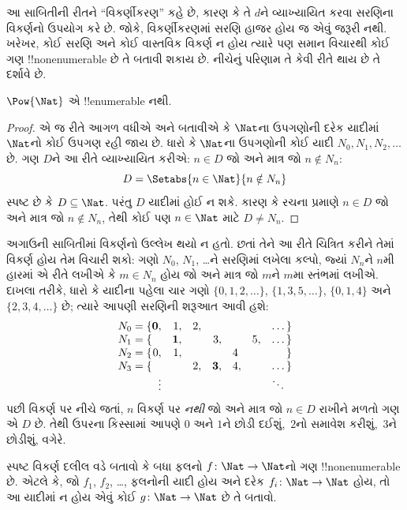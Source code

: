 \documentclass[../../../include/open-logic-section]{subfiles}
\begin{document}
\begin{explain}
આ સાબિતીની રીતને “વિકર્ણીકરણ” કહે છે, કારણ કે તે $d$ને વ્યાખ્યાયિત
કરવા સરણિના વિકર્ણનો ઉપયોગ કરે છે. જોકે, વિકર્ણીકરણમાં સરણિ હાજર
હોય જ એવું જરૂરી નથી. ખરેખર, કોઈ સરણિ અને કોઈ વાસ્તવિક વિકર્ણ ન
હોય ત્યારે પણ સમાન વિચારથી કોઈ ગણ !!{nonenumerable} છે તે બતાવી
શકાય છે. નીચેનું પરિણામ તે કેવી રીતે થાય છે તે દર્શાવે છે.
\end{explain}

\begin{thm}
$\Pow{\Nat}$ એ !!{enumerable} નથી.
\end{thm}

\begin{proof}
એ જ રીતે આગળ વધીએ અને બતાવીએ કે $\Nat$ના ઉપગણોની દરેક યાદીમાં
$\Nat$નો કોઈ ઉપગણ રહી જાય છે. ધારો કે $\Nat$ના ઉપગણોની કોઈ યાદી
$N_0, N_1, N_2, \ldots$ છે. ગણ $D$ને આ રીતે વ્યાખ્યાયિત કરીએ:
$n \in D$ જો અને માત્ર જો $n \notin N_{n}$:
\[
D = \Setabs{n \in \Nat}{n \notin N_n}
\]
સ્પષ્ટ છે કે $D\subseteq \Nat$. પરંતુ $D$ યાદીમાં હોઈ ન શકે.
કારણ કે રચના પ્રમાણે $n \in D$ જો અને માત્ર જો $n\notin N_n$,
તેથી કોઈ પણ $n \in \Nat$ માટે $D \neq N_n$.
\end{proof}

\begin{explain}
અગાઉની સાબિતીમાં વિકર્ણનો ઉલ્લેખ થયો ન હતો. છતાં તેને આ રીતે
ચિત્રિત કરીને તેમાં વિકર્ણ હોય તેમ વિચારી શકો: ગણો $N_0$, $N_1$,
\dots{}ને સરણિમાં લખેલા કલ્પો, જ્યાં $N_n$ને $n$મી હારમાં એ રીતે
લખીએ કે $m \in N_n$ હોય જો અને માત્ર જો $m$ને $m$મા સ્તંભમાં
લખીએ. દાખલા તરીકે, ધારો કે યાદીના પહેલા ચાર ગણો
$\{0,1,2,\dots\}$, $\{1, 3, 5, \dots\}$, $\{0,1,4\}$ અને
$\{2,3,4,\dots\}$ છે; ત્યારે આપણી સરણિની શરૂઆત આવી હશે:
\[
\begin{array}{r@{}rrrrrrr}
  N_0 = \{ & \mathbf{0}, & 1, & 2, & & & & \dots\}\\
  N_1 = \{ &  & \mathbf{1}, &  & 3, &  & 5, & \dots\}\\
  N_2 = \{ & 0, & 1, &  &  & 4\phantom{,} &  & \}\\
  N_3 = \{ &  &  & 2, & \mathbf{3}, & 4, & & \dots\}\\
  &\vdots & & & & & & \ddots\phantom{\}}
  \end{array}
\]
પછી વિકર્ણ પર નીચે જતાં, $n$ વિકર્ણ પર \emph{નથી} જો અને માત્ર જો
$n \in D$ રાખીને મળતો ગણ એ $D$ છે. તેથી ઉપરના કિસ્સામાં આપણે
$0$ અને $1$ને છોડી દઈશું,~$2$નો સમાવેશ કરીશું,~$3$ને છોડીશું, વગેરે.
\end{explain}

\begin{prob}
સ્પષ્ટ વિકર્ણ દલીલ વડે બતાવો કે બધા ફલનો
$f \colon \Nat \to \Nat$નો ગણ !!{nonenumerable} છે. એટલે કે,
જો $f_1$, $f_2$, \dots, ફલનોની યાદી હોય અને દરેક
$f_i\colon \Nat \to \Nat$ હોય, તો આ યાદીમાં ન હોય એવું કોઈ
$g \colon \Nat \to \Nat$ છે તે બતાવો.
\end{prob}
\end{document}
